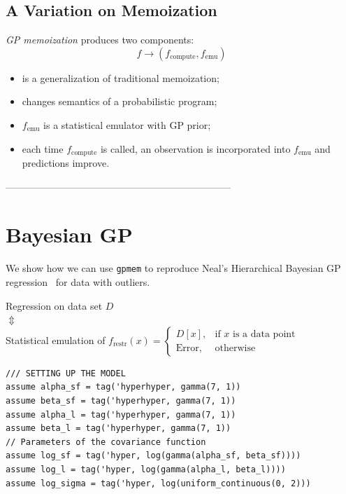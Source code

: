 \documentclass[a0,portrait]{a0poster}
\newcommand{\compute}{{\textrm{compute}}}
\newcommand{\emu}{{\textrm{emu}}}
\newcommand{\restr}{{\textrm{restr}}}
\begin{document}
\begin{multicols}{3}
\subsection*{A Variation on Memoization}
{\em GP memoization} produces two components:
\[ f \to (f_\compute, f_\emu) \]
\begin{itemize}
\setlength{\itemindent}{1cm}
 \item is a generalization of traditional memoization;
 \item changes semantics of a probabilistic program;
 \item $f_\emu$ is a statistical emulator with GP prior;
 \item each time $f_\compute$ is called, an observation is incorporated into $f_\emu$ and predictions improve.
\end{itemize}


---------------------------------------------------------------------


\section*{Bayesian GP}

We show how we can use  {\tt gpmem} to reproduce Neal's Hierarchical Bayesian GP regression~\cite{neal1997monte} for data with outliers.

\begin{center}
Regression on data set $D$ \\
$\Updownarrow$ \\
Statistical emulation of $f_\restr(x) = \begin{cases}
      D[x], & \text{if $x$ is a data point} \\
      \text{Error}, & \text{otherwise}
    \end{cases}$
\end{center}
\vspace{1cm}
\begin{minipage}{\linewidth}
\belowcaptionskip=-10pt
\begin{lstlisting}[frame=single,mathescape,label=alg:gphierarch,basicstyle=\fontsize{20}{22}\selectfont\ttfamily]
/// SETTING UP THE MODEL
assume alpha_sf = tag('hyperhyper, gamma(7, 1))
assume beta_sf = tag('hyperhyper, gamma(7, 1))
assume alpha_l = tag('hyperhyper, gamma(7, 1))
assume beta_l = tag('hyperhyper, gamma(7, 1))
// Parameters of the covariance function
assume log_sf = tag('hyper, log(gamma(alpha_sf, beta_sf))))
assume log_l = tag('hyper, log(gamma(alpha_l, beta_l))))
assume log_sigma = tag('hyper, log(uniform_continuous(0, 2)))


\end{lstlisting}
\end{minipage}
\end{multicols}
\end{document}
